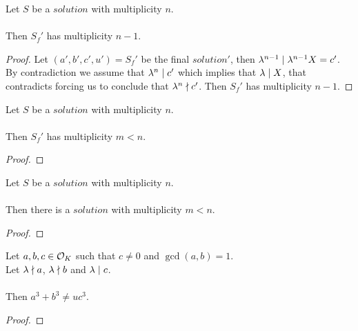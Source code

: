 \begin{lemma}
    \label{lmm:Solution1_final_multiplicity}
    \leanok
    Let $S$ be a $solution$ with multiplicity $n$.\\\\
    Then $S_f'$ has multiplicity $n-1$.
\end{lemma}
\begin{proof}
    \leanok
    Let $(a',b',c',u') = S_f'$ be the final $solution'$, then
    $\lambda^{n-1} \mid \lambda^{n-1} X = c'$.
    By contradiction we assume that $\lambda^n \mid c'$ which implies that $\lambda \mid X$,
    that contradicts  forcing us to conclude
    that $\lambda^{n} \nmid c'$. Then $S_f'$ has multiplicity $n-1$.
\end{proof}

\begin{lemma}
    \label{lmm:Solution1_final_multiplicity_lt}
    \leanok
    Let $S$ be a $solution$ with multiplicity $n$.\\\\
    Then $S_f'$ has multiplicity $m<n$.
\end{lemma}
\begin{proof}
    \leanok
\end{proof}

\begin{theorem}
    \label{lmm:exists_Solution_multiplicity_lt}
    \leanok
    Let $S$ be a $solution$ with multiplicity $n$.\\\\
    Then there is a $solution$ with multiplicity $m<n$.
\end{theorem}
\begin{proof}
    \leanok
\end{proof}

\begin{theorem}
    \label{thm:fermatLastTheoremForThreeGen}
    \leanok
    Let $a, b, c \in \mathcal{O}_K$ such that $c \neq 0$ and $\gcd(a,b)=1$. \\
    Let $\lambda \nmid a$, $\lambda \nmid b$ and $\lambda \mid c$. \\\\
    Then $a^3 + b^3 \neq u c^3$.
\end{theorem}
\begin{proof}
    \leanok
\end{proof}


